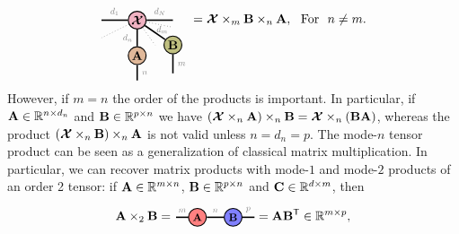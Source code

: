 \begin{enumerate}
$$\begin{tikzpicture}[baseline=-0.5ex]
    \tikzset{tensor/.style = {minimum size = 0.5cm,shape = circle,thick,draw=black,inner sep = 0pt}, edge/.style = {thick,line width=.4mm},every loop/.style={}}
    \def\x{0}
    \def\y{0}
    \node[tensor,fill=blue!20!red!30!white] (Xt) at (\x,\y) {$\Xt$};
    \node[tensor,fill=green!30!red!40!white] (A) at (\x,\y-1) {$\Ab$};
    \node[tensor,fill=green!50!red!50!white] (B) at (\x+1,\y-0.7) {$\Bb$};
    \draw[edge] (Xt) -- (\x-1,\y) node [midway,above] {\scalebox{0.7}{\dimcolor{$d_1$}}};
    \draw[dotted] (Xt) -- (\x-1,\y-0.5);
    \draw[edge] (Xt) -- (\x+1,\y) node [midway,above] {\scalebox{0.7}{\dimcolor{$d_N$}}};
    \node[draw=none] () at (\x+0.7,\y-0.27) {\scalebox{0.7}{\textcolor{gray}{$d_m$}}};
    \draw[edge] (Xt) -- (A) node [midway,left] {\scalebox{0.7}{\dimcolor{$d_n$}}};
    \draw[edge] (A) -- (\x,\y-1.7) node [midway,right] {\scalebox{0.7}{\textcolor{gray}{$n$}}};
    \draw[edge] (Xt) -- (B);
    \draw[edge] (B) -- (\x+1,\y-1.5) node [midway,right] {\scalebox{0.7}{\dimcolor{$m$}}};
    \draw[dotted] (Xt) -- (\x+1,\y-0.2);
    \draw[dotted] (Xt) -- (\x+0.5,\y-0.7);
    \end{tikzpicture}
= \Xt\ttm m\Bb\ttm n \Ab,~~\text{For}~~n\neq m.
$$
However, if $m = n$ the order of the products is important. In particular, if $\mathbf{A}\in\mathbb{R}^{n\times d_n}$ and $\mathbf{B}\in\mathbb{R}^{p\times n}$ we have $(\bm{\mathcal{X}}\times_{n} \mathbf{A}) \times_{n} \mathbf{B} = \bm{\mathcal{X}}\times_{n}(\mathbf{B}\mathbf{A})$, whereas the product $(\bm{\mathcal{X}}\times_{n} \mathbf{B}) \times_{n} \mathbf{A}$ is not valid unless $n=d_n=p$.
The mode-$n$ tensor product can be seen as a generalization of classical matrix multiplication. In particular,
we can recover matrix products with mode-$1$ and mode-$2$ products of an order 2 tensor: 
if $\mathbf{A}\in\mathbb{R}^{m\times n}$, $\mathbf{B}\in\mathbb{R}^{p\times n}$ and $\mathbf{C}\in\mathbb{R}^{d\times m}$, then
\begin{align*}
\Ab\ttm2 \Bb
=
\begin{tikzpicture}[baseline=\baseline]
   \tikzset{tensor/.style = {minimum size = 0.5cm,shape = circle,thick,draw=black,inner sep = 0pt}, edge/.style = {thick,line width=.4mm},every loop/.style={}}
    \def\y{0}
    \def\x{0}
    \node[tensor,fill=red!50!white] (A) at (\x,\y){\scalebox{0.85}{$\Ab$}};
    \node[tensor,fill=blue!50!white] (B) at (\x+1,\y){\scalebox{0.85}{$\Bb$}};
    \draw[edge] (A) -- (B) node [above,midway] {\scalebox{0.7}{\dimcolor{$n$}}};
    \draw[edge] (\x-0.25,\y) -- (\x-0.6,\y)  node [midway,above] {\scalebox{0.7}{\dimcolor{$m$}}};
    \draw[edge] (\x+1.25,\y) -- (\x+1.6,\y)  node [midway,above] {\scalebox{0.7}{\dimcolor{$p$}}};
    \end{tikzpicture}
    = \Ab\Bb^\ts\in\RR^{m\times p},

\end{align*}
\end{enumerate}
